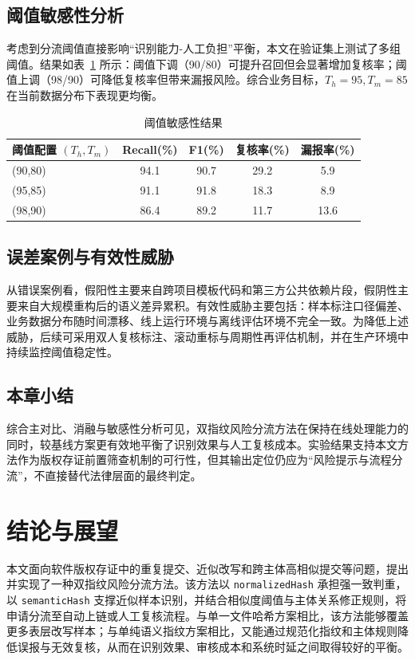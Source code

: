 \documentclass[UTF8,a4paper,zihao=5]{ctexart}
\begin{document}
\subsection{阈值敏感性分析}
考虑到分流阈值直接影响“识别能力-人工负担”平衡，本文在验证集上测试了多组阈值。结果如表~\ref{tab:threshold-result} 所示：阈值下调（90/80）可提升召回但会显著增加复核率；阈值上调（98/90）可降低复核率但带来漏报风险。综合业务目标，$T_h=95,T_m=85$ 在当前数据分布下表现更均衡。

\begin{table}[htbp]
  \centering
  \caption{阈值敏感性结果}
  \label{tab:threshold-result}
  \begin{tabular}{lcccc}
    \toprule
    阈值配置 $(T_h,T_m)$ & Recall(\%) & F1(\%) & 复核率(\%) & 漏报率(\%) \\
    \midrule
    (90,80) & 94.1 & 90.7 & 29.2 & 5.9 \\
    (95,85) & 91.1 & 91.8 & 18.3 & 8.9 \\
    (98,90) & 86.4 & 89.2 & 11.7 & 13.6 \\
    \bottomrule
  \end{tabular}
\end{table}

\subsection{误差案例与有效性威胁}
从错误案例看，假阳性主要来自跨项目模板代码和第三方公共依赖片段，假阴性主要来自大规模重构后的语义差异累积。有效性威胁主要包括：样本标注口径偏差、业务数据分布随时间漂移、线上运行环境与离线评估环境不完全一致。为降低上述威胁，后续可采用双人复核标注、滚动重标与周期性再评估机制，并在生产环境中持续监控阈值稳定性。

\subsection{本章小结}
综合主对比、消融与敏感性分析可见，双指纹风险分流方法在保持在线处理能力的同时，较基线方案更有效地平衡了识别效果与人工复核成本。实验结果支持本文方法作为版权存证前置筛查机制的可行性，但其输出定位仍应为“风险提示与流程分流”，不直接替代法律层面的最终判定。

\section{结论与展望}
本文面向软件版权存证中的重复提交、近似改写和跨主体高相似提交等问题，提出并实现了一种双指纹风险分流方法。该方法以 \texttt{normalizedHash} 承担强一致判重，以 \texttt{semanticHash} 支撑近似样本识别，并结合相似度阈值与主体关系修正规则，将申请分流至自动上链或人工复核流程。与单一文件哈希方案相比，该方法能够覆盖更多表层改写样本；与单纯语义指纹方案相比，又能通过规范化指纹和主体规则降低误报与无效复核，从而在识别效果、审核成本和系统时延之间取得较好的平衡。
\end{document}
